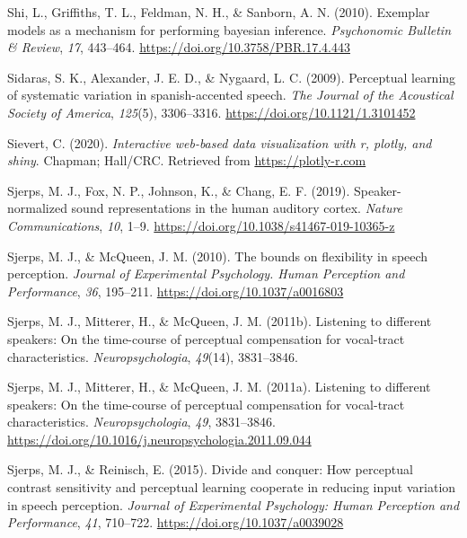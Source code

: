 \documentclass[
  11pt,
  man,floatsintext]{apa6}
\newlength{\cslhangindent}
\newlength{\cslentryspacingunit} %
\newenvironment{CSLReferences}[2] %
 {%
  \setlength{\parindent}{0pt}
  \ifodd #1
  \let\oldpar\par
  \def\par{\hangindent=\cslhangindent\oldpar}
  \fi
  \setlength{\parskip}{#2\cslentryspacingunit}
 }%
 {}
\begin{document}
\begin{CSLReferences}{1}{0}
\leavevmode{}%
Shi, L., Griffiths, T. L., Feldman, N. H., \& Sanborn, A. N. (2010). Exemplar models as a mechanism for performing bayesian inference. \emph{Psychonomic Bulletin \& Review}, \emph{17}, 443--464. \url{https://doi.org/10.3758/PBR.17.4.443}

\leavevmode{}%
Sidaras, S. K., Alexander, J. E. D., \& Nygaard, L. C. (2009). Perceptual learning of systematic variation in spanish-accented speech. \emph{The Journal of the Acoustical Society of America}, \emph{125}(5), 3306--3316. \url{https://doi.org/10.1121/1.3101452}

\leavevmode{}%
Sievert, C. (2020). \emph{Interactive web-based data visualization with r, plotly, and shiny}. Chapman; Hall/CRC. Retrieved from \url{https://plotly-r.com}

\leavevmode{}%
Sjerps, M. J., Fox, N. P., Johnson, K., \& Chang, E. F. (2019). Speaker-normalized sound representations in the human auditory cortex. \emph{Nature Communications}, \emph{10}, 1--9. \url{https://doi.org/10.1038/s41467-019-10365-z}

\leavevmode{}%
Sjerps, M. J., \& McQueen, J. M. (2010). The bounds on flexibility in speech perception. \emph{Journal of Experimental Psychology. Human Perception and Performance}, \emph{36}, 195--211. \url{https://doi.org/10.1037/a0016803}

\leavevmode{}%
Sjerps, M. J., Mitterer, H., \& McQueen, J. M. (2011b). Listening to different speakers: On the time-course of perceptual compensation for vocal-tract characteristics. \emph{Neuropsychologia}, \emph{49}(14), 3831--3846.

\leavevmode{}%
Sjerps, M. J., Mitterer, H., \& McQueen, J. M. (2011a). Listening to different speakers: On the time-course of perceptual compensation for vocal-tract characteristics. \emph{Neuropsychologia}, \emph{49}, 3831--3846. \url{https://doi.org/10.1016/j.neuropsychologia.2011.09.044}

\leavevmode{}%
Sjerps, M. J., \& Reinisch, E. (2015). Divide and conquer: How perceptual contrast sensitivity and perceptual learning cooperate in reducing input variation in speech perception. \emph{Journal of Experimental Psychology: Human Perception and Performance}, \emph{41}, 710--722. \url{https://doi.org/10.1037/a0039028}


\end{CSLReferences}
\end{document}
